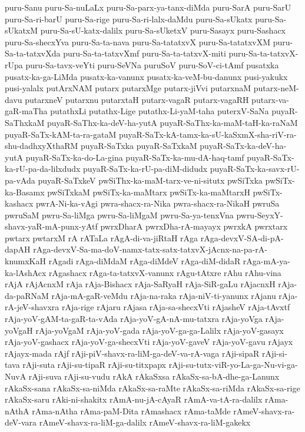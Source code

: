 {puru-Sanu
puru-Sa-nuLaLx
puru-Sa-parx-ya-tanx-diMda
puru-SarA
puru-SarU
puru-Sa-ri-barU
puru-Sa-rige
puru-Sa-ri-lalx-daMdu
puru-Sa-sUkatx
puru-Sa-sUkatxM
puru-Sa-sU-katx-dalilx
puru-Sa-sUketxV
puru-Sasayx
puru-Sashacx
puru-Sa-shecxYva
puru-Sa-ta-nava
puru-Sa-tatatxvX
puru-Sa-tatatxvXM
puru-Sa-ta-tatxvXda
puru-Sa-ta-tatxvXmf
puru-Sa-ta-tatxvX-miti
puru-Sa-ta-tatxvX-rUpa
puru-Sa-tavx-veYti
puru-SeVNa
puruSoV
puru-SoV-ci-tAmf
pusatxka
pusatx-ka-ga-LiMda
pusatx-ka-vanunx
pusatx-ka-veM-bu-danunx
pusi-yakukx
pusi-yalalx
putArxNAM
putarx
putarxMge
putarx-jiVvi
putarxnaM
putarx-neM-davu
putarxneV
putarxnu
putarxtaH
putarx-vagaR
putarx-vagaRH
putarx-va-gaR-maTha
putathxLi
putathx-Lige
putathx-Li-yaM-taha
puterxV-SaNa
puyaR-SaThxkaM
puyaR-SaThx-ka-deV-ha-yutA
puyaR-SaThx-ka-maM-taH-ka-raNaM
puyaR-SaTx-kAM-ta-ra-gataM
puyaR-SaTx-kA-tamx-ka-sU-kaSxmX-sha-riV-ra-shu-dadhxyXthaRM
puyaR-SaTxka
puyaR-SaTxkaM
puyaR-SaTx-ka-deV-ha-yutA
puyaR-SaTx-ka-do-La-gina
puyaR-SaTx-ka-mu-dA-haq-tamf
puyaR-SaTx-ka-rU-pa-da-lilxdudx
puyaR-SaTx-ka-rU-pa-diM-didudx
puyaR-SaTx-ka-savx-rU-pa-vAda
puyaR-SaTxkeV
pwSiThx-ka-maM-tarx-ve-ni-situtx
pwSiTxka
pwSiTx-ka-Basamx
pwSiTxkaM
pwSiTx-ka-maMtarx
pwSiTx-ka-maMtarxH
pwSiTx-kashacx
pwrA-Ni-ka-vAgi
pwra-shacx-ra-Nika
pwra-shacx-ra-NikaH
pwruSa
pwruSaM
pwru-Sa-liMga
pwru-Sa-liMgaM
pwru-Sa-ya-tenxVna
pwru-SeyxY-shavx-yaR-mA-punx-yAtf
pwrxDharA
pwrxDha-rA-mayayx
pwrxkA
pwrxtarx
pwtarx
pwtarxM
rA
rATaLa
rAgA-di-va-jiRtaH
rAga
rAga-devxV-SA-di-pA-dapAH
rAga-devxV-Sa-ma-doV-namx-tatx-satx-tatxvX-jAcnx-na-pa-rA-knumxKaH
rAgadi
rAga-diMdaM
rAga-diMdeV
rAga-diM-didaR
rAga-mA-ya-ka-lAshAcx
rAgashacx
rAga-ta-tatxvX-vanunx
rAgu-tAtxre
rAhu
rAhu-vina
rAjA
rAjAcnxM
rAja
rAja-Bishacx
rAja-SaRyaH
rAja-SiR-gaLu
rAjacnxH
rAja-da-paRNaM
rAja-mA-gaR-veMdu
rAja-na-raka
rAja-niV-ti-yanunx
rAjanu
rAja-rA-jeV-shavxra
rAja-rige
rAjaru
rAjasa
rAja-sa-shecxVti
rAjasheV
rAja-tAvxtf
rAja-yoV-gAM-ta-gaR-ta-vAda
rAja-yoV-gA-nA-mu-tatxra
rAja-yoVga
rAja-yoVgaH
rAja-yoVgaM
rAja-yoV-gada
rAja-yoV-ga-ga-Lalilx
rAja-yoV-gasayx
rAja-yoV-gashacx
rAja-yoV-ga-shecxVti
rAja-yoV-gaveV
rAja-yoV-gavu
rAjayx
rAjayx-mada
rAjf
rAji-piV-shavx-ra-liM-ga-deV-va-rA-vaga
rAji-sipaR
rAji-si-tava
rAji-suta
rAji-su-tipaR
rAji-su-titxpapx
rAji-su-tutx-viR-yo-La-ga-Nu-vi-ga-NuvA
rAji-suva
rAji-su-vudu
rAkA
rAkaSxsa
rAkaSx-sa-bA-dhe-ga-Lanunx
rAkaSx-sana
rAkaSx-sa-niMda
rAkaSx-sa-raMte
rAkaSx-sa-riMda
rAkaSx-sa-rige
rAkaSx-saru
rAki-ni-shakitx
rAmA-nu-jA-cAyaR
rAmA-va-tA-ra-dalilx
rAma-nAthA
rAma-nAtha
rAma-paM-Dita
rAmashacx
rAma-taMde
rAmeV-shavx-ra-deV-vara
rAmeV-shavx-ra-liM-ga-dalilx
rAmeV-shavx-ra-liM-gakekx
}
